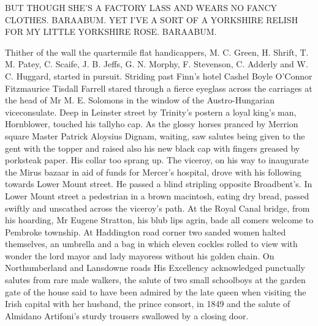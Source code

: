     BUT THOUGH SHE'S A FACTORY LASS
    AND WEARS NO FANCY CLOTHES.
    BARAABUM.
    YET I'VE A SORT OF A
    YORKSHIRE RELISH FOR
    MY LITTLE YORKSHIRE ROSE.
    BARAABUM.


Thither of the wall the quartermile flat handicappers, M. C. Green, H.
Shrift, T. M. Patey, C. Scaife, J. B. Jeffs, G. N. Morphy, F. Stevenson,
C. Adderly and W. C. Huggard, started in pursuit. Striding past Finn's
hotel Cashel Boyle O'Connor Fitzmaurice Tisdall Farrell stared through a
fierce eyeglass across the carriages at the head of Mr M. E. Solomons in
the window of the Austro-Hungarian viceconsulate. Deep in Leinster street
by Trinity's postern a loyal king's man, Hornblower, touched his tallyho
cap. As the glossy horses pranced by Merrion square Master Patrick
Aloysius Dignam, waiting, saw salutes being given to the gent with the
topper and raised also his new black cap with fingers greased by
porksteak paper. His collar too sprang up. The viceroy, on his way to
inaugurate the Mirus bazaar in aid of funds for Mercer's hospital,
drove with his following towards Lower Mount street. He passed a blind
stripling opposite Broadbent's. In Lower Mount street a pedestrian in a
brown macintosh, eating dry bread, passed swiftly and unscathed across the
viceroy's path. At the Royal Canal bridge, from his hoarding, Mr Eugene
Stratton, his blub lips agrin, bade all comers welcome to Pembroke
township. At Haddington road corner two sanded women halted themselves,
an umbrella and a bag in which eleven cockles rolled to view with wonder
the lord mayor and lady mayoress without his golden chain. On
Northumberland and Lansdowne roads His Excellency acknowledged punctually
salutes from rare male walkers, the salute of two small schoolboys at the
garden gate of the house said to have been admired by the late queen when
visiting the Irish capital with her husband, the prince consort, in 1849
and the salute of Almidano Artifoni's sturdy trousers swallowed by a
closing door.
